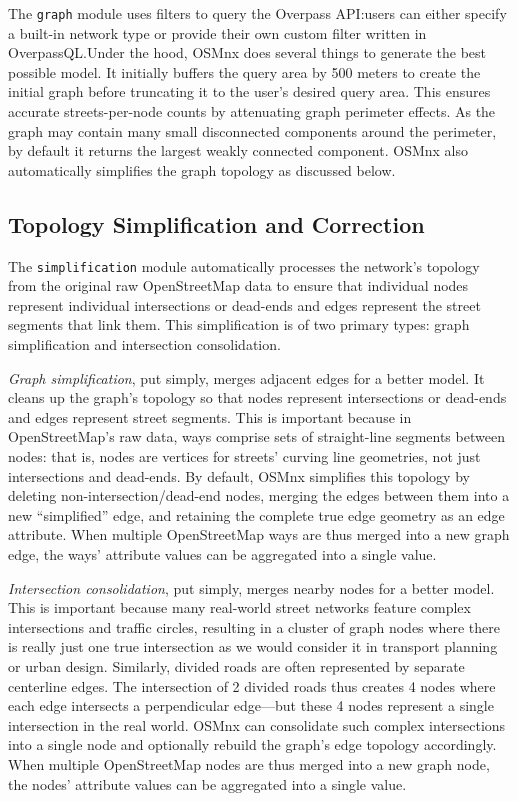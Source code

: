 \documentclass[12pt,letterpaper]{article} %
\begin{document}
The \texttt{graph} module uses filters to query the Overpass API:\@ users can either specify a built-in network type or provide their own custom filter written in OverpassQL.\@ Under the hood, OSMnx does several things to generate the best possible model. It initially buffers the query area by 500 meters to create the initial graph before truncating it to the user's desired query area. This ensures accurate streets-per-node counts by attenuating graph perimeter effects. As the graph may contain many small disconnected components around the perimeter, by default it returns the largest weakly connected component. OSMnx also automatically simplifies the graph topology as discussed below.

\subsection{Topology Simplification and Correction}

The \texttt{simplification} module automatically processes the network's topology from the original raw OpenStreetMap data to ensure that individual nodes represent individual intersections or dead-ends and edges represent the street segments that link them. This simplification is of two primary types: graph simplification and intersection consolidation.

\textit{Graph simplification}, put simply, merges adjacent edges for a better model. It cleans up the graph's topology so that nodes represent intersections or dead-ends and edges represent street segments. This is important because in OpenStreetMap's raw data, ways comprise sets of straight-line segments between nodes: that is, nodes are vertices for streets' curving line geometries, not just intersections and dead-ends. By default, OSMnx simplifies this topology by deleting non-intersection/dead-end nodes, merging the edges between them into a new \enquote{simplified} edge, and retaining the complete true edge geometry as an edge attribute. When multiple OpenStreetMap ways are thus merged into a new graph edge, the ways' attribute values can be aggregated into a single value.

\textit{Intersection consolidation}, put simply, merges nearby nodes for a better model. This is important because many real-world street networks feature complex intersections and traffic circles, resulting in a cluster of graph nodes where there is really just one true intersection as we would consider it in transport planning or urban design. Similarly, divided roads are often represented by separate centerline edges. The intersection of 2 divided roads thus creates 4 nodes where each edge intersects a perpendicular edge---but these 4 nodes represent a single intersection in the real world. OSMnx can consolidate such complex intersections into a single node and optionally rebuild the graph's edge topology accordingly. When multiple OpenStreetMap nodes are thus merged into a new graph node, the nodes' attribute values can be aggregated into a single value.
\end{document}

